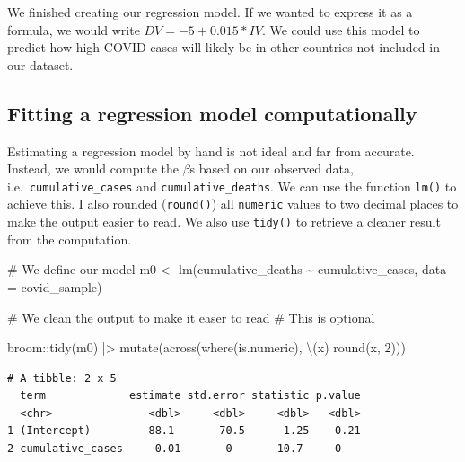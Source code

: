 \documentclass[
  letterpaper,
]{krantz}
\makeatletter
\newenvironment{Shaded}{\begin{snugshade}}{\end{snugshade}}
\newcommand{\AttributeTok}[1]{\textcolor[rgb]{0.40,0.45,0.13}{#1}}
\newcommand{\CommentTok}[1]{\textcolor[rgb]{0.37,0.37,0.37}{#1}}
\newcommand{\DecValTok}[1]{\textcolor[rgb]{0.68,0.00,0.00}{#1}}
\newcommand{\FunctionTok}[1]{\textcolor[rgb]{0.28,0.35,0.67}{#1}}
\newcommand{\NormalTok}[1]{\textcolor[rgb]{0.00,0.23,0.31}{#1}}
\newcommand{\OtherTok}[1]{\textcolor[rgb]{0.00,0.23,0.31}{#1}}
\newcommand{\SpecialCharTok}[1]{\textcolor[rgb]{0.37,0.37,0.37}{#1}}
\newenvironment{kframe}{%
\medskip{}
\setlength{\fboxsep}{.8em}
 \def\at@end@of@kframe{}%
 \ifinner\ifhmode%
  \def\at@end@of@kframe{\end{minipage}}%
  \begin{minipage}{\columnwidth}%
 \fi\fi%
 \def\FrameCommand##1{\hskip\@totalleftmargin \hskip-\fboxsep
 \colorbox{shadecolor}{##1}\hskip-\fboxsep
     \hskip-\linewidth \hskip-\@totalleftmargin \hskip\columnwidth}%
 \MakeFramed {\advance\hsize-\width
   \@totalleftmargin\z@ \linewidth\hsize
   \@setminipage}}%
 {\par\unskip\endMakeFramed%
 \at@end@of@kframe}
\renewenvironment{Shaded}{\begin{kframe}}{\end{kframe}}
\makeatother
\begin{document}
We finished creating our regression model. If we wanted to express it as
a formula, we would write \(DV = -5 + 0.015 * IV\). We could use this
model to predict how high COVID cases will likely be in other countries
not included in our dataset.

\subsection{Fitting a regression model
computationally}\label{sec-fitting-a-regression-model-computationally}

Estimating a regression model by hand is not ideal and far from
accurate. Instead, we would compute the \(\beta\)s based on our observed
data, i.e.~\texttt{cumulative\_cases} and \texttt{cumulative\_deaths}.
We can use the function \texttt{lm()} to achieve this. I also rounded
(\texttt{round()}) all \texttt{numeric} values to two decimal places to
make the output easier to read. We also use \texttt{tidy()} to retrieve
a cleaner result from the computation.

\begin{Shaded}
\begin{Highlighting}[]
\CommentTok{\# We define our model}
\NormalTok{m0 }\OtherTok{\textless{}{-}} \FunctionTok{lm}\NormalTok{(cumulative\_deaths }\SpecialCharTok{\textasciitilde{}}\NormalTok{ cumulative\_cases, }\AttributeTok{data =}\NormalTok{ covid\_sample)}

\CommentTok{\# We clean the output to make it easer to read}
\CommentTok{\# This is optional}

\NormalTok{broom}\SpecialCharTok{::}\FunctionTok{tidy}\NormalTok{(m0) }\SpecialCharTok{|\textgreater{}}
  \FunctionTok{mutate}\NormalTok{(}\FunctionTok{across}\NormalTok{(}\FunctionTok{where}\NormalTok{(is.numeric), \textbackslash{}(x) }\FunctionTok{round}\NormalTok{(x, }\DecValTok{2}\NormalTok{)))}
\end{Highlighting}
\end{Shaded}

\begin{verbatim}
# A tibble: 2 x 5
  term             estimate std.error statistic p.value
  <chr>               <dbl>     <dbl>     <dbl>   <dbl>
1 (Intercept)         88.1       70.5      1.25    0.21
2 cumulative_cases     0.01       0       10.7     0   
\end{verbatim}
\end{document}
